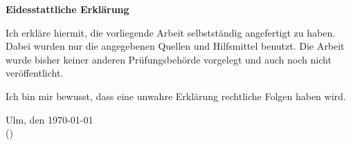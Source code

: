 \thispagestyle{empty}
\begin{center}
\sffamily\bfseries\Large Eidesstattliche Erklärung
\end{center}
Ich erkläre hiermit, die vorliegende Arbeit selbstständig angefertigt zu haben.
Dabei wurden nur die angegebenen Quellen und Hilfsmittel benutzt.
Die Arbeit wurde bisher keiner anderen Prüfungsbehörde vorgelegt und auch noch nicht veröffentlicht.

Ich bin mir bewusst, dass eine unwahre Erklärung rechtliche Folgen haben wird.

\vspace{1 cm}
Ulm, den \today\hfill\underline{\hspace{8 cm}}
\vspace{0.1 cm}
\\
\hspace*{7.5 cm} (\authorinfo)